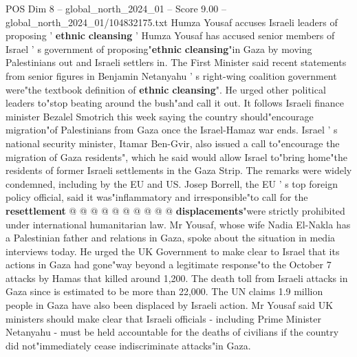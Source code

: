\begin{textsample}{POS Dim 8 – global\_north\_2024\_01 – Score 9.00 – global\_north\_2024\_01/104832175.txt}  \label{ex:f8_pos_231}
Humza Yousaf accuses Israeli leaders of proposing ' \textbf{ethnic} \textbf{cleansing} ' Humza Yousaf has accused senior members of Israel ' s government of proposing"\textbf{ethnic} \textbf{cleansing}"in Gaza by moving Palestinians out and Israeli settlers in.
The First Minister said recent statements from senior figures in Benjamin Netanyahu ' s right-wing coalition government were"the textbook definition of \textbf{ethnic} \textbf{cleansing}".
He urged other political leaders to"stop beating around the bush"and call it out.
It follows Israeli finance minister Bezalel Smotrich this week saying the country should"encourage migration"of Palestinians from Gaza once the Israel-Hamaz war ends.
Israel ' s national security minister, Itamar Ben-Gvir, also issued a call to"encourage the migration of Gaza residents", which he said would allow Israel to"bring home"the residents of former Israeli settlements in the Gaza Strip.
The remarks were widely condemned, including by the EU and US.
Josep Borrell, the EU ' s top foreign policy official, said it was"inflammatory and irresponsible"to call for the \textbf{resettlement} @ @ @ @ @ @ @ @ @ @ \textbf{displacements}"were strictly prohibited under international humanitarian law.
Mr Yousaf, whose wife Nadia El-Nakla has a Palestinian father and relations in Gaza, spoke about the situation in media interviews today.
He urged the UK Government to make clear to Israel that its actions in Gaza had gone"way beyond a legitimate response"to the October 7 attacks by Hamas that killed around 1,200.
The death toll from Israeli attacks in Gaza since is estimated to be more than 22,000.
The UN claims 1.9 million people in Gaza have also been displaced by Israeli action.
Mr Yousaf said UK ministers should make clear that Israeli officials - including Prime Minister Netanyahu - must be held accountable for the deaths of civilians if the country did not"immediately cease indiscriminate attacks"in Gaza.

\end{textsample}
